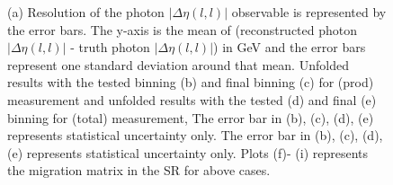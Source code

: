 \begin{figure}[ht]
    \hfill
    \hfill
    \hfill
    \hfill

    \caption{(a) Resolution of the photon $|\Delta \eta(l,l)|$ observable is represented by the error bars. The y-axis
    is the mean of (reconstructed photon $|\Delta \eta(l,l)|$ - truth photon $|\Delta \eta(l,l)|$) in GeV and the error bars represent
    one standard deviation around that mean.
    Unfolded results with the tested binning (b) and final
    binning (c) for \tty(prod) measurement and unfolded results with the tested
    (d) and final (e) binning for \tty(total) measurement, The error bar in (b),
    (c), (d), (e) represents statistical uncertainty only.
    The error bar in (b), (c), (d), (e) represents statistical uncertainty only.
    Plots (f)- (i) represents the migration matrix in the SR for above cases.}

\end{figure}
\FloatBarrier

